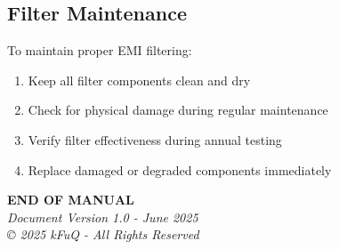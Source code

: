 \documentclass[11pt,a4paper]{article}
\begin{document}
\subsection{Filter Maintenance}
To maintain proper EMI filtering:
\begin{enumerate}
    \item Keep all filter components clean and dry
    \item Check for physical damage during regular maintenance
    \item Verify filter effectiveness during annual testing
    \item Replace damaged or degraded components immediately
\end{enumerate}

\vfill
\begin{center}
\textbf{END OF MANUAL}\\
\textit{Document Version 1.0 - June 2025}\\
\textit{© 2025 kFuQ - All Rights Reserved}
\end{center}
\end{document}
